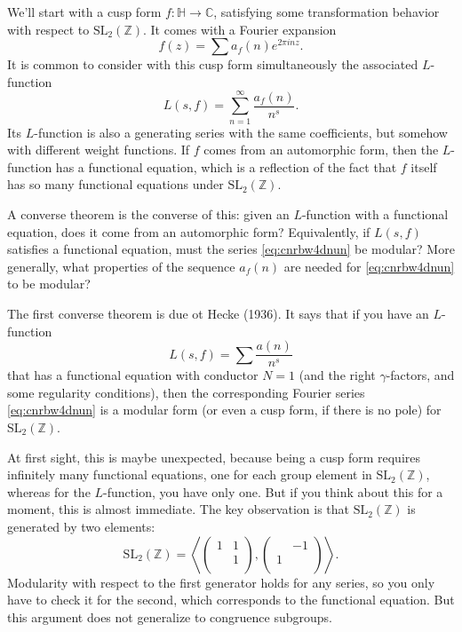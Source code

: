 \documentclass[reqno]{amsart} 
\numberwithin{theorem}{section}
\numberwithin{equation}{section}
\begin{document}
We'll start with a cusp form $f : \mathbb{H} \rightarrow \mathbb{C}$, satisfying some transformation behavior with respect to $\mathrm{SL}_2(\mathbb{Z})$.  It comes with a Fourier expansion
\begin{equation}\label{eq:cnrbw4dnun}
  f(z) = \sum a_f(n) e^{2 \pi i n z}.
\end{equation}
It is common to consider with this cusp form simultaneously the associated $L$-function
\begin{equation*}
  L(s, f) = \sum_{n = 1}^\infty \frac{a_f(n)}{ n^s}.
\end{equation*}
Its $L$-function is also a generating series with the same coefficients, but somehow with different weight functions.  If $f$ comes from an automorphic form, then the $L$-function has a functional equation, which is a reflection of the fact that $f$ itself has so many functional equations under $\mathrm{SL}_2(\mathbb{Z})$.

A converse theorem is the converse of this: given an $L$-function with a functional equation, does it come from an automorphic form?  Equivalently, if $L(s, f)$ satisfies a functional equation, must the series \eqref{eq:cnrbw4dnun} be modular?  More generally, what properties of the sequence $a_f(n)$ are needed for \eqref{eq:cnrbw4dnun} to be modular?

The first converse theorem is due ot Hecke (1936).  It says that if you have an $L$-function
\begin{equation*}
  L(s, f) = \sum \frac{a(n)}{ n^s}
\end{equation*}
that has a functional equation with conductor $N = 1$ (and the right $\gamma$-factors, and some regularity conditions), then the corresponding Fourier series \eqref{eq:cnrbw4dnun} is a modular form (or even a cusp form, if there is no pole) for $\mathrm{SL}_2(\mathbb{Z})$.

At first sight, this is maybe unexpected, because being a cusp form requires infinitely many functional equations, one for each group element in $\mathrm{SL}_2(\mathbb{Z})$, whereas for the $L$-function, you have only one.  But if you think about this for a moment, this is almost immediate.  The key observation is that $\mathrm{SL}_2(\mathbb{Z})$ is generated by two elements:
\begin{equation*}
  \mathrm{SL}_2(\mathbb{Z}) = \left\langle
    \begin{pmatrix}
      1      & 1 \\
             & 1 \\
    \end{pmatrix},
    \begin{pmatrix}
      & -1 \\
      1 &  \\
    \end{pmatrix}\right\rangle.
\end{equation*}
Modularity with respect to the first generator holds for any series, so you only have to check it for the second, which corresponds to the functional equation.  But this argument does not generalize to congruence subgroups.
\end{document}
